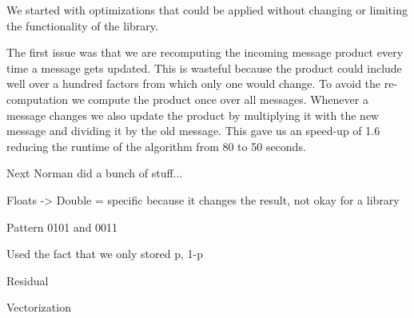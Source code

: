 We started with optimizations that could be applied without changing or limiting the functionality of the library.

The first issue was that we are recomputing the incoming message product every time a message gets updated. This is wasteful because the product could include well over a hundred factors from which only one would change. To avoid the re-computation we compute the product once over all messages. Whenever a message changes we also update the product by multiplying it with the new message and dividing it by the old message. This gave us an speed-up of 1.6 reducing the runtime of the algorithm from 80 to 50 seconds.

Next Norman did a bunch of stuff...

Floats -> Double = specific because it changes the result, not okay for a library

Pattern 0101 and 0011

Used the fact that we only stored p, 1-p

Residual

Vectorization


